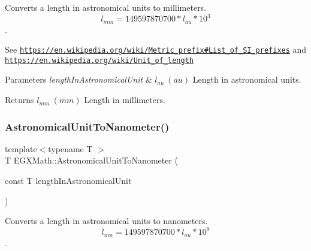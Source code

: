 Converts a length in astronomical units to millimeters. \[ l_{mm}=149597870700 * l_{au} * 10^{3} \]. 

See \href{https://en.wikipedia.org/wiki/Metric_prefix#List_of_SI_prefixes}{\tt https\+://en.\+wikipedia.\+org/wiki/\+Metric\+\_\+prefix\#\+List\+\_\+of\+\_\+\+S\+I\+\_\+prefixes} and \href{https://en.wikipedia.org/wiki/Unit_of_length}{\tt https\+://en.\+wikipedia.\+org/wiki/\+Unit\+\_\+of\+\_\+length} 
\begin{DoxyParams}{Parameters}
{\em length\+In\+Astronomical\+Unit} & $ l_{au}\ (au)$ Length in astronomical units. \\
\hline
\end{DoxyParams}
\begin{DoxyReturn}{Returns}
$ l_{mm}\ (mm)$ Length in millimeters. 
\end{DoxyReturn}
\mbox{\label{group___e_g_x_math-_conversions-_length_conversions-_astronomical-_astronomical_unit-_s_i_ga96544de7ba57c47bcdf515f2603d0460}} 
\subsubsection{\texorpdfstring{Astronomical\+Unit\+To\+Nanometer()}{AstronomicalUnitToNanometer()}}
{\footnotesize\ttfamily template$<$typename T $>$ \\
T E\+G\+X\+Math\+::\+Astronomical\+Unit\+To\+Nanometer (\begin{DoxyParamCaption}\item[{const T}]{length\+In\+Astronomical\+Unit }\end{DoxyParamCaption})}



Converts a length in astronomical units to nanometers. \[ l_{nm}=149597870700 * l_{au} * 10^{9} \]. 


